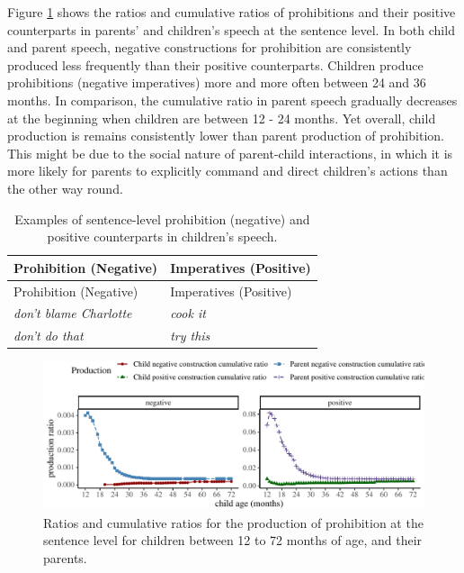 \documentclass[
  english,
  man,floatsintext]{apa6}
\begin{document}
Figure \ref{fig:prohibition} shows the ratios and cumulative ratios of prohibitions and their positive counterparts in parents' and children's speech at the sentence level. In both child and parent speech, negative constructions for prohibition are consistently produced less frequently than their positive counterparts. Children produce prohibitions (negative imperatives) more and more often between 24 and 36 months. In comparison, the cumulative ratio in parent speech gradually decreases at the beginning when children are between 12 - 24 months. Yet overall, child production is remains consistently lower than parent production of prohibition. This might be due to the social nature of parent-child interactions, in which it is more likely for parents to explicitly command and direct children's actions than the other way round.

\begin{longtable}[]{@{}ll@{}}
\caption{\label{tab:prohibit} Examples of sentence-level prohibition (negative) and positive counterparts in children's speech.}\tabularnewline
\toprule
Prohibition (Negative) & Imperatives (Positive) \\
\midrule
\endfirsthead
\toprule
Prohibition (Negative) & Imperatives (Positive) \\
\midrule
\endhead
\emph{don't blame Charlotte} & \emph{cook it} \\
\emph{don't do that} & \emph{try this} \\
\bottomrule
\end{longtable}

\begin{figure}[H]

{\centering \includegraphics{neg_construction_article_files/figure-latex/prohibition-1} 

}

\caption{Ratios and cumulative ratios for the production of prohibition at the sentence level for children between 12 to 72 months of age, and their parents.}\label{fig:prohibition}
\end{figure}
\end{document}
